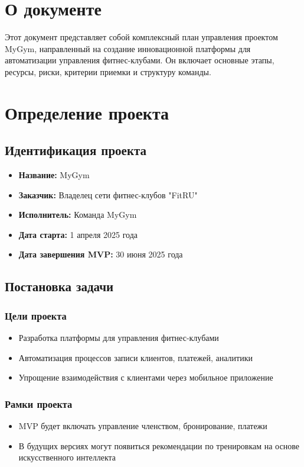 \documentclass[14pt, russian]{matmex-diploma-custom}
\begin{document}

\maketitle
\section{О документе}
Этот документ представляет собой комплексный план управления проектом MyGym, направленный на создание инновационной платформы для автоматизации управления фитнес-клубами. Он
включает основные этапы, ресурсы, риски, критерии приемки и структуру команды.

\section{Определение проекта}
\subsection{Идентификация проекта}
\begin{itemize}
\item \textbf{Название:} MyGym
\item \textbf{Заказчик:} Владелец сети фитнес-клубов "FitRU"
\item \textbf{Исполнитель:} Команда MyGym
\item \textbf{Дата старта:} 1 апреля 2025 года
\item \textbf{Дата завершения MVP:} 30 июня 2025 года
\end{itemize}

\subsection{Постановка задачи}
\subsubsection{Цели проекта}
\begin{itemize}
\item Разработка платформы для управления фитнес-клубами
\item Автоматизация процессов записи клиентов, платежей, аналитики
\item Упрощение взаимодействия с клиентами через мобильное приложение
\end{itemize}

\subsubsection{Рамки проекта}
\begin{itemize}
\item MVP будет включать управление членством, бронирование, платежи
\item В будущих версиях могут появиться рекомендации по тренировкам на основе искусственного интеллекта
\end{itemize}
\end{document}

